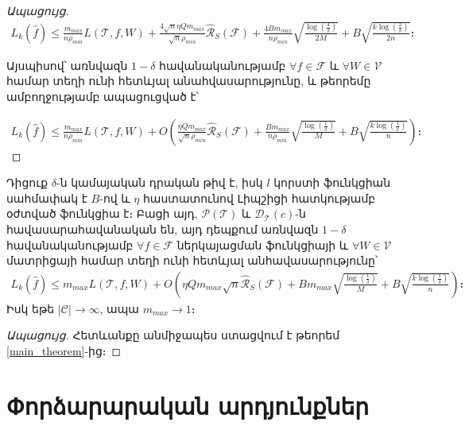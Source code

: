 \documentclass[12pt]{article}
\begin{document}
\begin{proof}[Ապացույց]
 
\begin{align*}
\label{ineq_rad_10}
L_k(\hat{f}) \leq  \frac{m_{max}}{n \rho_{min}}  L(\mathcal{T}, f, W) +
\frac{4 \sqrt{n}\eta Qm_{max}}{\sqrt{n}\rho_{min}} \hat{\mathcal{R}}_S(\mathcal{F})+    \frac{4Bm_{max}}{n\rho_{min}}\sqrt{\frac{\log \left( \frac{4}{\delta} \right)}{2M}} + B\sqrt{\frac{k\log \left(\frac{2}{\delta}\right) }{2n}}։
\end{align*}

Այսպիսով՝ առնվազն $1-\delta$ հավանականությամբ $\forall f \in \mathcal{F}$ և $\forall W \in \mathcal{V}$ համար տեղի ունի հետևյալ անահվասարությունը, և թեորեմը ամբողջությամբ ապացուցված է՝

\begin{align*}
L_k(\hat{f}) \leq  \frac{m_{max}}{n \rho_{min}}  L(\mathcal{T}, f, W)+ O\left(
\frac{\eta Qm_{max}}{\sqrt{n}\rho_{min}} \hat{\mathcal{R}}_S(\mathcal{F})+    \frac{Bm_{max}}{n\rho_{min}}\sqrt{\frac{\log \left( \frac{1}{\delta} \right)}{M}} + B\sqrt{\frac{k\log \left(\frac{1}{\delta}\right) }{n}} \right)։
\end{align*}
 \end{proof}
 
 
 \begin{corollary}
Դիցուք $\delta$-ն կամայական դրական թիվ է, իսկ $l$ կորստի ֆունկցիան սահմափակ է $B$-ով և $\eta$ հաստատունով Լիպշիցի հատկությամբ օժտված ֆունկցիա է։ Բացի այդ, $\mathcal{P}(\mathcal{T})$ և $\mathcal{D}_\mathcal{T}(c)$-ն հավասարահավանական են, այդ դեպքում առնվազն $1-\delta$ հավանականությամբ $\forall f \in \mathcal{F}$ ներկայացման ֆունկցիայի և $\forall W \in \mathcal{V}$ մատրիցայի համար տեղի ունի հետևյալ անհավասարությունը՝ 
\begin{align*}
L_k(\hat{f}) \leq m_{max}  L(\mathcal{T}, f, W)+ O\left(
\eta Qm_{max}\sqrt{n} \hat{\mathcal{R}}_S(\mathcal{F})+   Bm_{max}\sqrt{\frac{\log \left( \frac{1}{\delta} \right)}{M}} + B\sqrt{\frac{k\log \left(\frac{1}{\delta}\right) }{n}} \right)։
\end{align*}
Իսկ եթե $|\mathcal{C}| \rightarrow \infty$, ապա $m_{max} \rightarrow 1$։
\end{corollary}
\begin{proof}[Ապացույց]
Հետևանքը անմիջապես ստացվում է թեորեմ \ref{main_theorem}-ից։
\end{proof} 


\pagebreak

\section*{\hfill Փորձարարական արդյունքներ \hfill} \noindent
{}
{}
\end{document}
